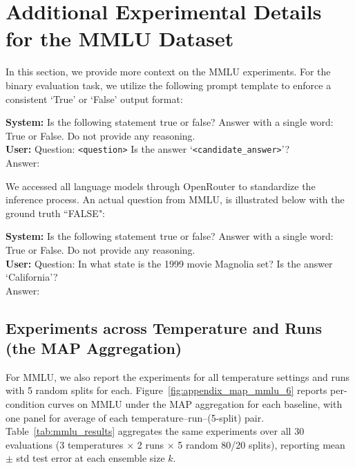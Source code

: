 \documentclass{article}
\theoremstyle{plain}
\theoremstyle{definition}
\theoremstyle{remark}
\begin{document}
\clearpage
\section{Additional Experimental Details for the MMLU Dataset}
In this section, we provide more context on the MMLU experiments.
\label{MMLU_app}
For the binary evaluation task, we utilize the following prompt template to enforce a consistent `True' or `False' output format:

\begin{tcolorbox}[
  colback=gray!8,
  colframe=gray!70!black,
  coltitle=white,
  title={\textbf{Query Format for MMLU Dataset}},
  fonttitle=\small,
  boxrule=0.8pt,
  arc=0pt,
  left=8pt,
  right=8pt,
  top=6pt,
  bottom=6pt
]
\small
\textbf{System:} Is the following statement true or false? Answer with a single word: True or False. Do not provide any reasoning.\\[4pt]
\textbf{User:} Question: \texttt{<question>} Is the answer `\texttt{<candidate\_answer>}'?\\
Answer:
\end{tcolorbox}

We accessed all language models through OpenRouter to standardize the inference process. An actual question from MMLU, is illustrated below with the ground truth ``FALSE":
\begin{tcolorbox}[
  colback=gray!8,
  colframe=gray!70!black,
  coltitle=white,
  title={\textbf{Example Query for MMLU Dataset}},
  fonttitle=\small,
  boxrule=0.8pt,
  arc=0pt,
  left=8pt,
  right=8pt,
  top=6pt,
  bottom=6pt
]
\small
\textbf{System:} Is the following statement true or false? Answer with a single word: True or False. Do not provide any reasoning.\\[4pt]
\textbf{User:} Question: In what state is the 1999 movie Magnolia set? Is the answer `California'?\\
Answer:
\end{tcolorbox}


\subsection{Experiments across Temperature and Runs (the MAP Aggregation)}
For MMLU, we also report the experiments for all temperature settings and runs with 5 random splits for each.
Figure~\ref{fig:appendix_map_mmlu_6} reports per-condition curves on MMLU under the MAP aggregation for each baseline, with one panel for average of each temperature--run--(5-split) pair. Table~\ref{tab:mmlu_results} aggregates the same experiments over all $30$ evaluations (3 temperatures $\times$ 2 runs $\times$ 5 random 80/20 splits), reporting mean $\pm$ std test error at each ensemble size $k$.
\end{document}
